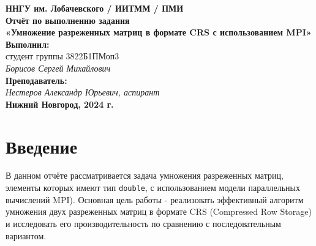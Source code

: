 \documentclass[12pt]{article}
\begin{document}

\begin{titlepage}
    \begin{center}
        \large 
        \textbf{ННГУ им. Лобачевского / ИИТММ / ПМИ}\\[0.5cm]
        
        \vspace{4cm}
        \textbf{\Large Отчёт по выполнению задания}\\
        \textbf{\large «Умножение разреженных матриц в формате CRS с использованием MPI»}\\[3cm]
        
        \vspace{3cm}
        \textbf{Выполнил:}\\
        студент группы 3822Б1ПМоп3 \\
        \textit{Борисов Сергей Михайлович}\\[1cm]

        \textbf{Преподаватель:}\\
        \textit{Нестеров Александр Юрьевич, аспирант}\\[2cm]
        
        \vfill
        \textbf{Нижний Новгород, 2024 г.}
    \end{center}
\end{titlepage}

\tableofcontents
\newpage


\section*{Введение}

В данном отчёте рассматривается задача умножения разреженных матриц, элементы которых имеют тип \texttt{double}, с использованием модели параллельных вычислений MPI). 
Основная цель работы - реализовать эффективный алгоритм умножения двух разреженных матриц в формате CRS (Compressed Row Storage) и исследовать его производительность по сравнению с последовательным вариантом.

\end{document}
